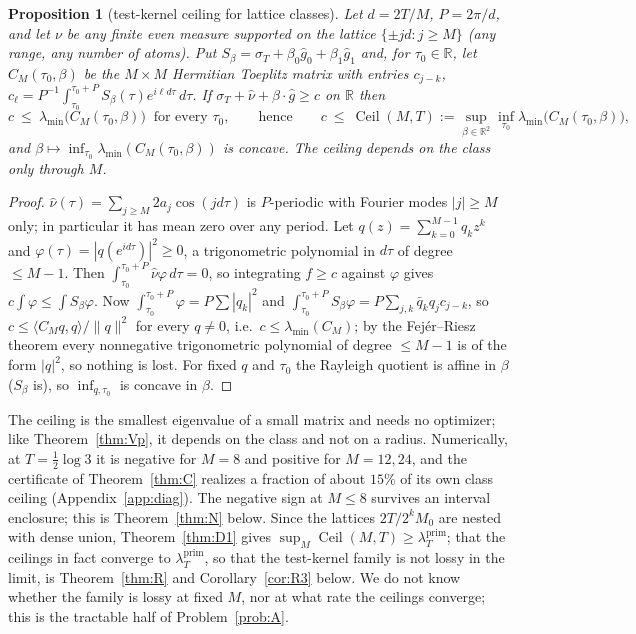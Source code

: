 \documentclass[11pt]{amsart}
\newtheorem{proposition}[theorem]{Proposition}
\theoremstyle{definition}
\theoremstyle{remark}
\newcommand{\R}{\mathbb R}
\newcommand{\lamP}{\lambda^{\mathrm{prim}}_T}
\newcommand{\sT}{\sigma_T}
\newcommand{\gh}[1]{\widehat g_{#1}}
\newcommand{\nuh}{\widehat\nu}
\begin{document}
\begin{proposition}[test-kernel ceiling for lattice classes]\label{prop:TK}
Let $d=2T/M$, $P=2\pi/d$, and let $\nu$ be any finite even measure supported on the lattice
$\{\pm jd:j\ge M\}$ (any range, any number of atoms). Put $S_\beta=\sT+\beta_0\gh0+\beta_1\gh1$ and,
for $\tau_0\in\R$, let $C_M(\tau_0,\beta)$ be the $M\times M$ Hermitian Toeplitz matrix with entries
$c_{j-k}$, $c_\ell=P^{-1}\int_{\tau_0}^{\tau_0+P}S_\beta(\tau)e^{i\ell d\tau}\,d\tau$. If
$\sT+\nuh+\beta\cdot\widehat g\ge c$ on $\R$ then
\[
c\ \le\ \lambda_{\min}\big(C_M(\tau_0,\beta)\big)\ \text{ for every }\tau_0,\qquad\text{hence}\qquad
c\ \le\ \operatorname{Ceil}(M,T):=\sup_{\beta\in\R^2}\inf_{\tau_0}\lambda_{\min}\big(C_M(\tau_0,\beta)\big),
\]
and $\beta\mapsto\inf_{\tau_0}\lambda_{\min}(C_M(\tau_0,\beta))$ is concave. The ceiling depends on
the class only through $M$.
\end{proposition}
\begin{proof}
$\nuh(\tau)=\sum_{j\ge M}2a_j\cos(jd\tau)$ is $P$-periodic with Fourier modes $|j|\ge M$ only; in
particular it has mean zero over any period. Let $q(z)=\sum_{k=0}^{M-1}q_kz^k$ and
$\varphi(\tau)=|q(e^{id\tau})|^2\ge0$, a trigonometric polynomial in $d\tau$ of degree $\le M-1$. Then
$\int_{\tau_0}^{\tau_0+P}\nuh\varphi\,d\tau=0$, so integrating $f\ge c$ against $\varphi$ gives
$c\int\varphi\le\int S_\beta\varphi$. Now $\int_{\tau_0}^{\tau_0+P}\varphi=P\sum|q_k|^2$ and
$\int_{\tau_0}^{\tau_0+P}S_\beta\varphi=P\sum_{j,k}\bar q_kq_jc_{j-k}$, so
$c\le\langle C_Mq,q\rangle/\|q\|^2$ for every $q\ne0$, i.e.\ $c\le\lambda_{\min}(C_M)$; by the
Fejér--Riesz theorem every nonnegative trigonometric polynomial of degree $\le M-1$ is of the form
$|q|^2$, so nothing is lost. For fixed $q$ and $\tau_0$ the Rayleigh quotient is affine in $\beta$
($S_\beta$ is), so $\inf_{q,\tau_0}$ is concave in $\beta$.
\end{proof}

The ceiling is the smallest eigenvalue of a small matrix and needs no optimizer; like
Theorem~\ref{thm:Vp}, it depends on the class and not on a radius. Numerically, at
$T=\frac12\log3$ it is negative for $M=8$ and positive for $M=12,24$, and the certificate of
Theorem~\ref{thm:C} realizes a fraction of about $15\%$ of its own class ceiling
(Appendix~\ref{app:diag}). The negative sign at $M\le8$ survives an interval enclosure; this is
Theorem~\ref{thm:N} below. Since the lattices $2T/2^kM_0$ are nested with dense union,
Theorem~\ref{thm:D1} gives $\sup_M\operatorname{Ceil}(M,T)\ge\lamP$; that the ceilings in fact
converge to $\lamP$, so that the test-kernel family is not lossy in the limit, is
Theorem~\ref{thm:R} and Corollary~\ref{cor:R3} below. We do not know whether the family is lossy at
fixed $M$, nor at what rate the ceilings converge; this is the tractable half of
Problem~\ref{prob:A}.
\end{document}

